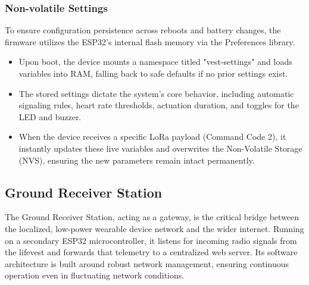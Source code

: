 \documentclass{article}
\begin{document}
\subsubsection{Non-volatile Settings}
To ensure configuration persistence across reboots and battery changes, the firmware utilizes the ESP32's internal flash memory via the Preferences library.

\begin{itemize}
\item Upon boot, the device mounts a namespace titled "vest-settings" and loads variables into RAM, falling back to safe defaults if no prior settings exist.

\item The stored settings dictate the system's core behavior, including automatic signaling rules, heart rate thresholds, actuation duration, and toggles for the LED and buzzer.

\item When the device receives a specific LoRa payload (Command Code 2), it instantly updates these live variables and overwrites the Non-Volatile Storage (NVS), ensuring the new parameters remain intact permanently.
\end{itemize}

\subsection{Ground Receiver Station}
The Ground Receiver Station, acting as a gateway, is the critical bridge between the localized, low-power wearable device network and the wider internet. Running on a secondary ESP32 microcontroller, it listens for incoming radio signals from the lifevest and forwards that telemetry to a centralized web server. Its software architecture is built around robust network management, ensuring continuous operation even in fluctuating network conditions.
\end{document}
